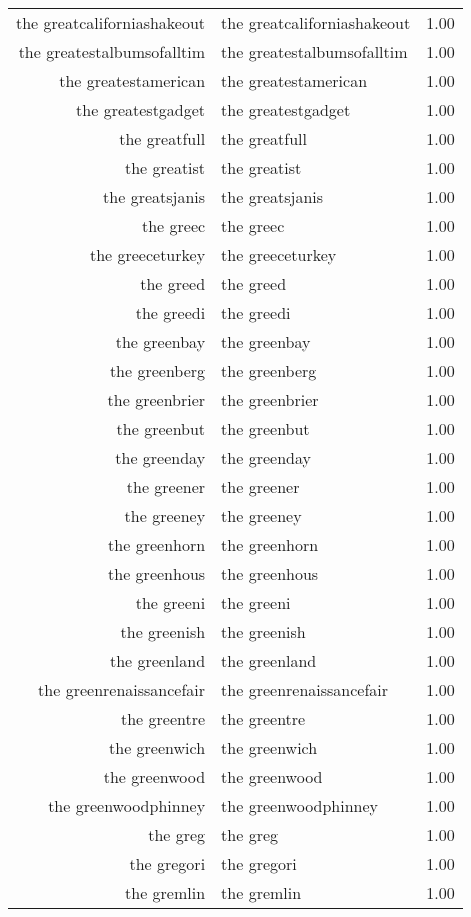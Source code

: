 \begin{table}[ht]
\begin{tabular}{rlr}
  the greatcaliforniashakeout & the greatcaliforniashakeout & 1.00 \\ 
  the greatestalbumsofalltim & the greatestalbumsofalltim & 1.00 \\ 
  the greatestamerican & the greatestamerican & 1.00 \\ 
  the greatestgadget & the greatestgadget & 1.00 \\ 
  the greatfull & the greatfull & 1.00 \\ 
  the greatist & the greatist & 1.00 \\ 
  the greatsjanis & the greatsjanis & 1.00 \\ 
  the greec & the greec & 1.00 \\ 
  the greeceturkey & the greeceturkey & 1.00 \\ 
  the greed & the greed & 1.00 \\ 
  the greedi & the greedi & 1.00 \\ 
  the greenbay & the greenbay & 1.00 \\ 
  the greenberg & the greenberg & 1.00 \\ 
  the greenbrier & the greenbrier & 1.00 \\ 
  the greenbut & the greenbut & 1.00 \\ 
  the greenday & the greenday & 1.00 \\ 
  the greener & the greener & 1.00 \\ 
  the greeney & the greeney & 1.00 \\ 
  the greenhorn & the greenhorn & 1.00 \\ 
  the greenhous & the greenhous & 1.00 \\ 
  the greeni & the greeni & 1.00 \\ 
  the greenish & the greenish & 1.00 \\ 
  the greenland & the greenland & 1.00 \\ 
  the greenrenaissancefair & the greenrenaissancefair & 1.00 \\ 
  the greentre & the greentre & 1.00 \\ 
  the greenwich & the greenwich & 1.00 \\ 
  the greenwood & the greenwood & 1.00 \\ 
  the greenwoodphinney & the greenwoodphinney & 1.00 \\ 
  the greg & the greg & 1.00 \\ 
  the gregori & the gregori & 1.00 \\ 
  the gremlin & the gremlin & 1.00 \\ 

\end{tabular}
\end{table}
